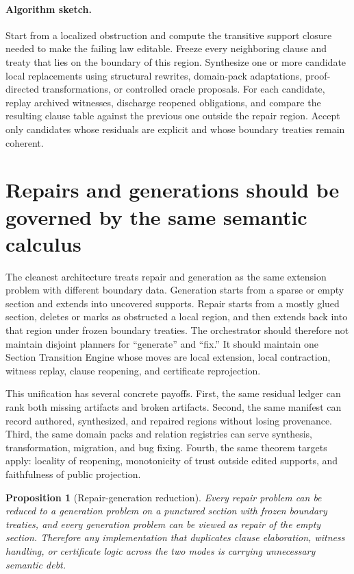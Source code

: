 \documentclass[11pt]{report}
\newtheorem{proposition}[definition]{Proposition}
\begin{document}
\paragraph{Algorithm sketch.}
Start from a localized obstruction and compute the transitive support closure needed to make the failing law editable. Freeze every neighboring clause and treaty that lies on the boundary of this region. Synthesize one or more candidate local replacements using structural rewrites, domain-pack adaptations, proof-directed transformations, or controlled oracle proposals. For each candidate, replay archived witnesses, discharge reopened obligations, and compare the resulting clause table against the previous one outside the repair region. Accept only candidates whose residuals are explicit and whose boundary treaties remain coherent.
\section{Repairs and generations should be governed by the same semantic calculus}
The cleanest architecture treats repair and generation as the same extension problem with different boundary data. Generation starts from a sparse or empty section and extends into uncovered supports. Repair starts from a mostly glued section, deletes or marks as obstructed a local region, and then extends back into that region under frozen boundary treaties. The orchestrator should therefore not maintain disjoint planners for ``generate'' and ``fix.'' It should maintain one Section Transition Engine whose moves are local extension, local contraction, witness replay, clause reopening, and certificate reprojection.

This unification has several concrete payoffs. First, the same residual ledger can rank both missing artifacts and broken artifacts. Second, the same manifest can record authored, synthesized, and repaired regions without losing provenance. Third, the same domain packs and relation registries can serve synthesis, transformation, migration, and bug fixing. Fourth, the same theorem targets apply: locality of reopening, monotonicity of trust outside edited supports, and faithfulness of public projection.

\begin{proposition}[Repair-generation reduction]
Every repair problem can be reduced to a generation problem on a punctured section with frozen boundary treaties, and every generation problem can be viewed as repair of the empty section. Therefore any implementation that duplicates clause elaboration, witness handling, or certificate logic across the two modes is carrying unnecessary semantic debt.
\end{proposition}
\end{document}
